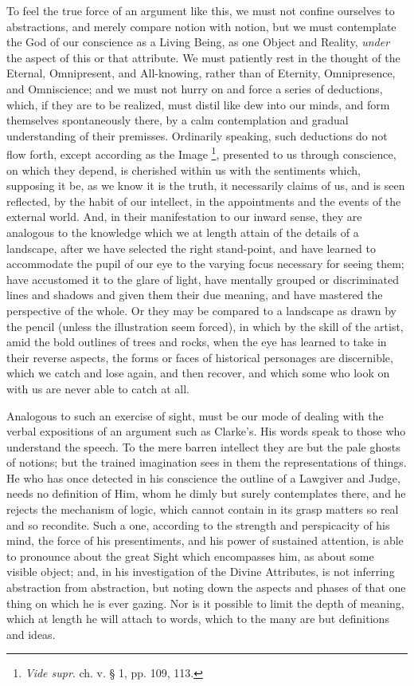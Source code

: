 To feel the true force of an argument like this, we must not
confine ourselves to abstractions, and merely compare notion with
notion, but we must contemplate the God of our conscience as a Living
Being, as one Object and Reality, \emph{under} the aspect of this or that
attribute. We must patiently rest in the thought of the Eternal,
Omnipresent, and All-knowing, rather than of Eternity, Omnipresence,
and Omniscience; and we must not hurry on and force a series of
deductions, which, if they are to be realized, must distil like dew
into our minds, and form themselves spontaneously there, by a calm
contemplation and gradual understanding of their premisses. Ordinarily
speaking, such deductions do not flow forth, except according as the
Image \footnote{\emph{Vide supr}.
ch. v. § 1, pp. 109, 113.}, presented to us
through conscience, on which they depend, is cherished within us with
the sentiments which, supposing it be, as we know it is the
truth, it necessarily claims of us, and is seen reflected, by the
habit of our intellect, in the appointments and the events of the
external world. And, in their manifestation to our inward sense, they
are analogous to the knowledge which we at length attain of the
details of a landscape, after we have selected the right stand-point,
and have learned to accommodate the pupil of our eye to the varying
focus necessary for seeing them; have accustomed it to the glare of
light, have mentally grouped or discriminated lines and shadows and
given them their due meaning, and have mastered the perspective of the
whole. Or they may be compared to a landscape as drawn by the pencil
(unless the illustration seem forced), in which by the skill of the
artist, amid the bold outlines of trees and rocks, when the eye has
learned to take in their reverse aspects, the forms or faces of
historical personages are discernible, which we catch and lose again,
and then recover, and which some who look on with us are never able to
catch at all.

Analogous to such an exercise of sight, must be our mode of dealing
with the verbal expositions of an argument such as Clarke's. His words
speak to those who understand the speech. To the mere barren intellect
they are but the pale ghosts of notions; but the trained imagination
sees in them the representations of things. He who has once detected
in his conscience the outline of a Lawgiver and Judge, needs no
definition of Him, whom he dimly but surely contemplates there, and he
rejects the mechanism of logic, which cannot contain in its grasp
matters so real and so recondite. Such a one, according to the
strength and perspicacity of his mind, the force of his presentiments,
and his power of sustained attention, is able to pronounce about the
great Sight which encompasses him, as about some visible object; and,
in his investigation of the Divine Attributes, is not inferring
abstraction from abstraction, but noting down the aspects and phases
of that one thing on which he is ever gazing. Nor is it possible to
limit the depth of meaning, which at length he will attach to words,
which to the many are but definitions and ideas.

